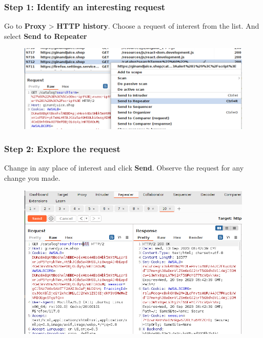 \documentclass[
	a4paper, %
	12pt, %
]{CSSullivanBusinessReport}
\begin{document}
\subsubsection*{Step 1: Identify an interesting request}
\begin{fullwidth}
    Go to {\color{orange}\textbf{Proxy}} > {\color{orange}\textbf{HTTP history}}. Choose a request of interest from the list. And select \textbf{Send to Repeater}
    \begin{figure}[H]
        \centering
        \includegraphics[width=1\linewidth]{Images//using repeater/select_request.png}         
    \end{figure}
\end{fullwidth}


\subsubsection*{Step 2: Explore the request}
\begin{fullwidth}
    Change in any place of interest and click {\color{orange}\textbf{Send}}. Observe the request for any change you made.
    \begin{figure}[H]
        \centering
        \includegraphics[width=1\linewidth]{Images//using repeater/repeater_window.png}
    \end{figure}
\end{fullwidth}
\end{document}
